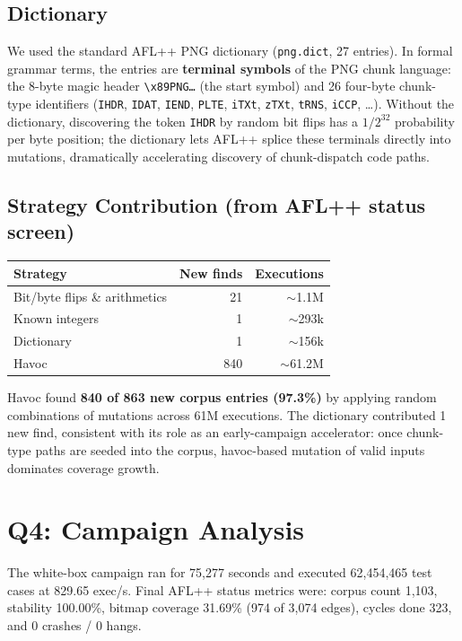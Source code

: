 \documentclass[letterpaper,twocolumn,10pt]{article}
\begin{document}
\subsection{Dictionary}
We used the standard AFL++ PNG dictionary (\texttt{png.dict}, 27 entries).
In formal grammar terms, the entries are \textbf{terminal symbols} of the PNG
chunk language: the 8-byte magic header \texttt{\textbackslash x89PNG\ldots}
(the start symbol) and 26 four-byte chunk-type identifiers
(\texttt{IHDR}, \texttt{IDAT}, \texttt{IEND}, \texttt{PLTE},
\texttt{iTXt}, \texttt{zTXt}, \texttt{tRNS}, \texttt{iCCP}, \ldots).
Without the dictionary, discovering the token \texttt{IHDR} by random bit flips
has a $1/2^{32}$ probability per byte position; the dictionary lets AFL++ splice
these terminals directly into mutations, dramatically accelerating discovery of
chunk-dispatch code paths.

\subsection{Strategy Contribution (from AFL++ status screen)}

\begin{center}
\small
\begin{tabular}{lrr}
\toprule
Strategy & New finds & Executions \\
\midrule
Bit/byte flips \& arithmetics & 21  & $\sim$1.1M \\
Known integers                &  1  & $\sim$293k \\
Dictionary                    &  1  & $\sim$156k \\
Havoc                         & 840 & $\sim$61.2M \\
\bottomrule
\end{tabular}
\end{center}

Havoc found \textbf{840 of 863 new corpus entries (97.3\%)} by applying
random combinations of mutations across 61M executions. The dictionary
contributed 1 new find, consistent with its role as an early-campaign
accelerator: once chunk-type paths are seeded into the corpus, havoc-based
mutation of valid inputs dominates coverage growth.

\section{Q4: Campaign Analysis}
The white-box campaign ran for 75,277 seconds and executed 62,454,465 test cases
at 829.65 exec/s. Final AFL++ status metrics were: corpus count 1,103,
stability 100.00\%, bitmap coverage 31.69\% (974 of 3,074 edges), cycles done 323,
and 0 crashes / 0 hangs.
\end{document}
